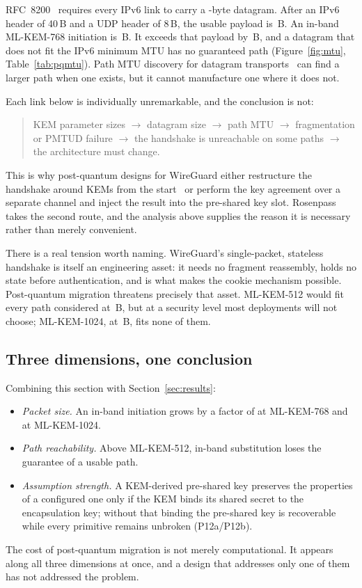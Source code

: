 RFC~8200~\cite{rfc8200} requires every IPv6 link to carry a
\wgIpvsixMtu-byte datagram. After an IPv6 header of 40\,B and a UDP header of
8\,B, the usable payload is \wgIpvsixPayload\,B. An in-band ML-KEM-768
initiation is \wgKemInit\,B. It exceeds that payload by \wgOvershoot\,B, and a
datagram that does not fit the IPv6 minimum MTU has no guaranteed path
(Figure~\ref{fig:mtu}, Table~\ref{tab:pqmtu}). Path MTU discovery for datagram
transports~\cite{rfc8899} can find a larger path when one exists, but it
cannot manufacture one where it does not.

 Each link below is individually
unremarkable, and the conclusion is not:

\begin{quote}
KEM parameter sizes \(\rightarrow\) datagram size \(\rightarrow\) path MTU
\(\rightarrow\) fragmentation or PMTUD failure \(\rightarrow\) the handshake
is unreachable on some paths \(\rightarrow\) the architecture must change.
\end{quote}

This is why post-quantum designs for WireGuard either restructure the
handshake around KEMs from the start~\cite{hulsing2021pqwireguard} or perform
the key agreement over a separate channel and inject the result into the
pre-shared key slot. Rosenpass~\cite{rosenpass2023} takes the second route,
and the analysis above supplies the reason it is necessary rather than merely
convenient.

 There is a real tension worth
naming. WireGuard's single-packet, stateless handshake is itself an
engineering asset: it needs no fragment reassembly, holds no state before
authentication, and is what makes the cookie mechanism possible. Post-quantum
migration threatens precisely that asset. ML-KEM-512 would fit every path
considered at \wgKemFiveInit\,B, but at a security level most deployments will
not choose; ML-KEM-1024, at \wgKemTenInit\,B, fits none of them.

\subsection{Three dimensions, one conclusion}

Combining this section with Section~\ref{sec:results}:

\begin{itemize}\itemsep2pt
\item \emph{Packet size.} An in-band initiation grows by a factor of
      \wgKemGrowth{} at ML-KEM-768 and \wgKemTenGrowth{} at ML-KEM-1024.
\item \emph{Path reachability.} Above ML-KEM-512, in-band substitution loses
      the guarantee of a usable path.
\item \emph{Assumption strength.} A KEM-derived pre-shared key preserves the
      properties of a configured one only if the KEM binds its shared secret
      to the encapsulation key; without that binding the pre-shared key is
      recoverable while every primitive remains unbroken (P12a/P12b).
\end{itemize}

The cost of post-quantum migration is not merely computational. It appears
along all three dimensions at once, and a design that addresses only one of
them has not addressed the problem.
